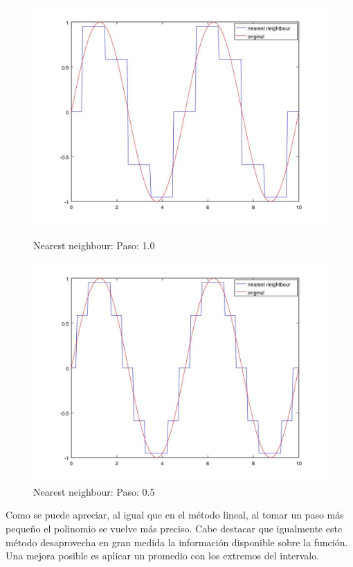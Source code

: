 \begin{figure}[h]
  \begin{minipage}[b]{.5\textwidth}
    \includegraphics[width=\textwidth]{complementos/nearest_1.jpg}
    \caption{Nearest neighbour: Paso: 1.0}
  \end{minipage}
  \begin{minipage}[b]{.5\textwidth}
    \includegraphics[width=\textwidth]{complementos/nearest_05.jpg}
    \caption{Nearest neighbour: Paso: 0.5}
  \end{minipage}
\end{figure}
\vspace{4mm}
Como se puede apreciar, al igual que en el método lineal, al tomar un paso más pequeño el polinomio se vuelve más preciso. Cabe destacar que igualmente este método desaprovecha en gran medida la información disponible sobre la función. Una mejora posible es aplicar un promedio con los extremos del intervalo.

